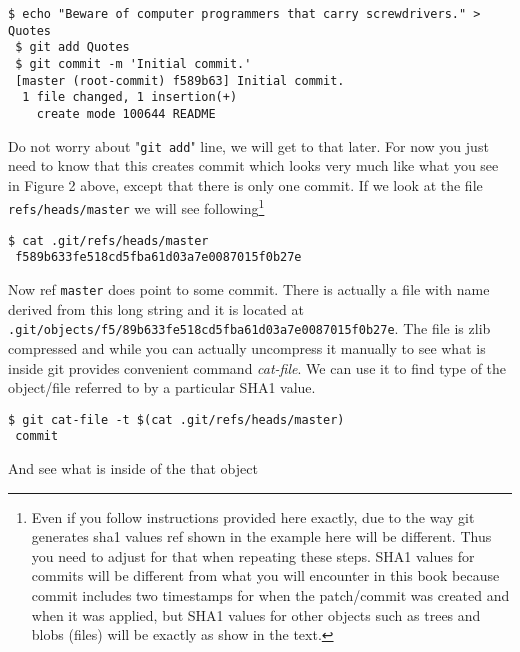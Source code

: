 \documentclass{article}
\theoremstyle{definition}
\begin{document}
        \begin{Verbatim}[frame=single]
 $ echo "Beware of computer programmers that carry screwdrivers." > Quotes
 $ git add Quotes
 $ git commit -m 'Initial commit.'
 [master (root-commit) f589b63] Initial commit.
  1 file changed, 1 insertion(+)
    create mode 100644 README
        \end{Verbatim}

        Do not worry about "\texttt{git add}" line, we will get to that later. For now you just need to know that this
        creates commit which looks very much like what you see in Figure 2 above, except that there is only one commit. If
        we look at the file \texttt{refs/heads/master} we will see following\footnote{Even if you follow instructions
        provided here exactly, due to the way git generates sha1 values ref shown in the example here will be different.
        Thus you need to adjust for that when repeating these steps. SHA1 values for commits will be different from what
        you will encounter in this book because commit includes two timestamps for when the patch/commit was created and
        when it was applied, but SHA1 values for other objects such as trees and blobs (files) will be exactly as show
        in the text.}

        \begin{Verbatim}[frame=single]
 $ cat .git/refs/heads/master
 f589b633fe518cd5fba61d03a7e0087015f0b27e
        \end{Verbatim}

        Now ref \texttt{master} does point to some commit. There is actually a file with name derived from this long
        string and it is located at \texttt{.git/objects/f5/89b633fe518cd5fba61d03a7e0087015f0b27e}. The file is zlib
        compressed and while you can actually uncompress it manually to see what is inside git provides convenient
        command {\em cat-file}. We can use it to find type of the object/file referred to by a particular SHA1 value.

        \begin{Verbatim}[frame=single]
 $ git cat-file -t $(cat .git/refs/heads/master)
 commit
        \end{Verbatim}
        And see what is inside of the that object
\end{document}
